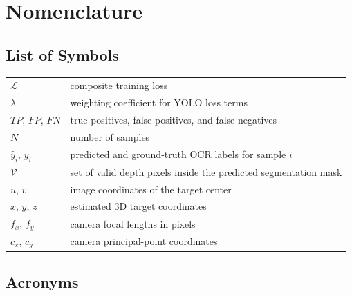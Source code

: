\documentclass[11pt,a4paper]{report}
\begin{document}
\chapter*{Nomenclature}

\section*{List of Symbols}
\noindent
\begin{tabular}{@{}p{}p{}@{}}
$\mathcal{L}$ & composite training loss \\
$\lambda$ & weighting coefficient for YOLO loss terms \\
$TP$, $FP$, $FN$ & true positives, false positives, and false negatives \\
$N$ & number of samples \\
$\hat{y}_i$, $y_i$ & predicted and ground-truth OCR labels for sample $i$ \\
$\mathcal{V}$ & set of valid depth pixels inside the predicted segmentation mask \\
$u$, $v$ & image coordinates of the target center \\
$x$, $y$, $z$ & estimated 3D target coordinates \\
$f_x$, $f_y$ & camera focal lengths in pixels \\
$c_x$, $c_y$ & camera principal-point coordinates \\
\end{tabular}

\section*{Acronyms}
\glsaddall[types=\acronymtype]
{\renewcommand*{\glossarysection}[2][]{%
}%
\printnoidxglossary[
  type=\acronymtype,
  title={}
]}
\clearpage



\tableofcontents
\clearpage

\listoffigures
\clearpage

\listoftables
\clearpage











\clearpage


\appendix





\end{document}
